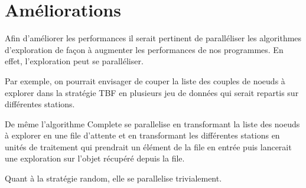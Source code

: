 \section{Améliorations}

Afin d'améliorer les performances il serait pertinent
de paralléliser les algorithmes d'exploration de façon à augmenter les performances
de nos programmes. En effet, l'exploration peut se paralléliser.

Par exemple, on pourrait
envisager de couper la liste des couples de noeuds à explorer dans la stratégie TBF en
plusieurs jeu de données qui serait repartis sur différentes stations.

De même l'algorithme Complete se parallelise en transformant la liste des noeuds à explorer
en une file d'attente et en transformant les différentes stations en unités de traitement qui prendrait
un élément de la file en entrée puis lancerait une exploration sur l'objet récupéré depuis la file.

Quant à la stratégie random, elle se parallelise trivialement.
